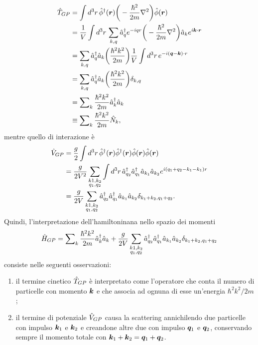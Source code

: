 \begin{equation}
    \begin{split}
        \hat{T}_{GP} &= \int d^3r\,\hat{\phi}^\dagger(\bm{r})\bigg(-\frac{\hbar^2}{2m}\nabla^2\bigg)\hat{\phi}(\bm{r}) \\
        &= \frac{1}{V}\int d^3r\,\sum_{k,q}\hat{a}^\dagger_qe^{-iqr}\bigg(-\frac{\hbar^2}{2m}\nabla^2\bigg)\hat{a}_ke^{i\bm{k}\cdot\bm{r}} \\
        &= \sum_{k,q}\hat{a}^\dagger_q\hat{a}_k\bigg(\frac{\hbar^2k^2}{2m}\bigg)\frac{1}{V}\int d^3r\,e^{-i(\bm{q} - \bm{k})\cdot r} \\
        &= \sum_{k,q}\hat{a}^\dagger_q\hat{a}_k\bigg(\frac{\hbar^2k^2}{2m}\bigg)\delta_{k,q} \\
        &= \sum\nolimits_{k}\frac{\hbar^2k^2}{2m}\hat{a}^\dagger_k\hat{a}_k \\
        &\equiv \sum\nolimits_{k}\frac{\hbar^2k^2}{2m}\hat{N}_k,
    \end{split}
\end{equation}
mentre quello di interazione è
\begin{equation}
    \begin{split}
        \hat{V}_{GP} &= \frac{g}{2}\int d^3r\,\hat{\phi}^\dagger(\bm{r})\hat{\phi}^\dagger(\bm{r})\hat{\phi}(\bm{r})\hat{\phi}(\bm{r}) \\
        &= \frac{g}{2V^2}\sum_{\substack{k1,k_2 \\ q_1,q_2}}\int d^3r\,\hat{a}^\dagger_{q_2}\hat{a}^\dagger_{q_1}\hat{a}_{k_1}\hat{a}_{k_2}e^{i(q_1 + q_2 - k_1 - k_1)r} \\
        &= \frac{g}{2V}\sum_{\substack{k1,k_2 \\ q_1,q_2}}\hat{a}^\dagger_{q_2}\hat{a}^\dagger_{q_1}\hat{a}_{k_1}\hat{a}_{k_2}\delta_{k_1 + k_2, q_1 + q_2}.
    \end{split}
\end{equation}
Quindi, l'interpretazione dell'hamiltoninana nello spazio dei momenti 
\begin{equation}
\label{eq: hamiltoniana nello spazio dei momenti}
    \hat{H}_{GP} = \sum\nolimits_k\frac{\hbar^2k^2}{2m}\hat{a}^\dagger_k\hat{a}_k + \frac{g}{2V}\sum_{\substack{k1,k_2 \\ q_1,q_2}}\hat{a}^\dagger_{q_2}\hat{a}^\dagger_{q_1}\hat{a}_{k_1}\hat{a}_{k_2}\delta_{k_1 + k_2, q_1 + q_2}
\end{equation}
consiste nelle seguenti osservazioni:
\begin{enumerate}
    \item il termine cinetico $\hat{T}_{GP}$ è interpretato come l'operatore che conta il numero di particelle con momento $\bm{k}$ e che associa ad ognuna di esse un'energia $\hbar^2k^2/2m$ ;
    \item il termine di potenziale $\hat{V}_{GP}$ causa la scattering annichilendo due particelle con impulso $\bm{k}_1$ e $\bm{k}_2$ e creandone altre due con impulso $\bm{q}_1$ e $\bm{q}_2$, conservando sempre il momento totale con $\bm{k}_1 + \bm{k}_2 = \bm{q}_1 + \bm{q}_2$.
\end{enumerate}
